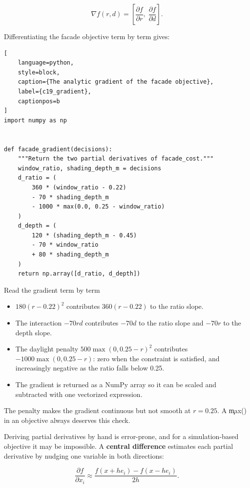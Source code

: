 \[
\nabla f(r, d) = \left[\frac{\partial f}{\partial r},\; \frac{\partial f}{\partial d}\right].
\]

Differentiating the facade objective term by term gives:

\begin{lstlisting}[
    language=python,
    style=block,
    caption={The analytic gradient of the facade objective},
    label={c19_gradient},
    captionpos=b
]
import numpy as np


def facade_gradient(decisions):
    """Return the two partial derivatives of facade_cost."""
    window_ratio, shading_depth_m = decisions
    d_ratio = (
        360 * (window_ratio - 0.22)
        - 70 * shading_depth_m
        - 1000 * max(0.0, 0.25 - window_ratio)
    )
    d_depth = (
        120 * (shading_depth_m - 0.45)
        - 70 * window_ratio
        + 80 * shading_depth_m
    )
    return np.array([d_ratio, d_depth])
\end{lstlisting}

\begin{SyntaxBox}{Read the gradient term by term}
\begin{itemize}
    \item $180(r-0.22)^2$ contributes $360(r-0.22)$ to the ratio slope.
    \item The interaction $-70rd$ contributes $-70d$ to the ratio slope and
          $-70r$ to the depth slope.
    \item The daylight penalty $500\max(0, 0.25-r)^2$ contributes
          $-1000\max(0, 0.25-r)$: zero when the constraint is satisfied, and
          increasingly negative as the ratio falls below 0.25.
    \item The gradient is returned as a NumPy array so it can be scaled and
          subtracted with one vectorized expression.
\end{itemize}
The penalty makes the gradient continuous but not smooth at $r = 0.25$. A
\c{max()} in an objective always deserves this check.
\end{SyntaxBox}


Deriving partial derivatives by hand is error-prone, and for a simulation-based
objective it may be impossible. A \textbf{central difference} estimates each
partial derivative by nudging one variable in both directions:

\[
\frac{\partial f}{\partial x_i} \approx \frac{f(x + h e_i) - f(x - h e_i)}{2h}.
\]

